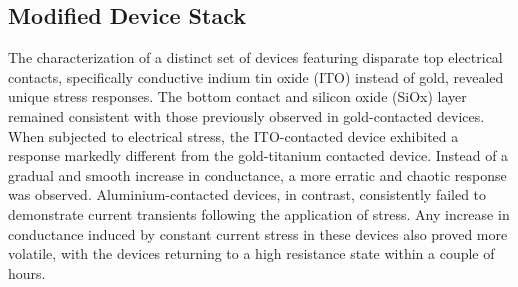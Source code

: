 \subsection[Modified Device Stack]{Modified Device Stack}



The characterization of a distinct set of devices featuring disparate top electrical contacts, specifically conductive indium tin oxide (ITO) instead of gold, revealed unique stress responses. The bottom contact and silicon oxide (SiOx) layer remained consistent with those previously observed in gold-contacted devices. When subjected to electrical stress, the ITO-contacted device exhibited a response markedly different from the gold-titanium contacted device. Instead of a gradual and smooth increase in conductance, a more erratic and chaotic response was observed. Aluminium-contacted devices, in contrast, consistently failed to demonstrate current transients following the application of stress. Any increase in conductance induced by constant current stress in these devices also proved more volatile, with the devices returning to a high resistance state within a couple of hours.\\

